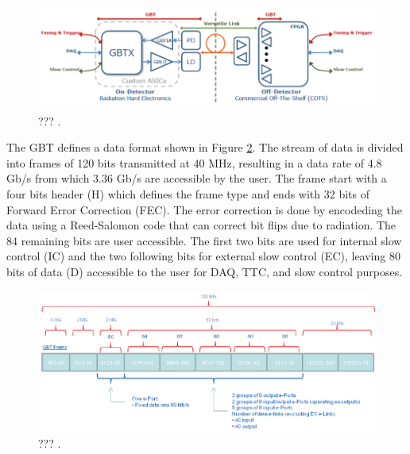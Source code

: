       \begin{figure}[h!]
        \centering
        \includegraphics[width=\textwidth]{img/II-2-daq/gbt-versatile.pdf}
        \caption{??? \cite{Moreira:1235836}.}
        \label{fig:II-2-daq-gbt-versatile}
      \end{figure}

      The GBT defines a data format shown in Figure \ref{fig:II-2-daq-gbt-frame}. The stream of data is divided into frames of 120 bits transmitted at 40 MHz, resulting in a data rate of 4.8 Gb/s from which 3.36 Gb/s are accessible by the user. The frame start with a four bits header (H) which defines the frame type and ends with 32 bits of Forward Error Correction (FEC). The error correction is done by encodeding the data using a Reed-Salomon code that can correct bit flips due to radiation. The 84 remaining bits are user accessible. The first two bits are used for internal slow control (IC) and the two following bits for external slow control (EC), leaving 80 bits of data (D) accessible to the user for DAQ, TTC, and slow control purposes. \\

      \begin{figure}[h!]
        \centering
        \includegraphics[width=\textwidth]{img/II-2-daq/gbt-frame.pdf}
        \caption{??? \cite{Moreira:1235836}.}
        \label{fig:II-2-daq-gbt-frame}
      \end{figure}

